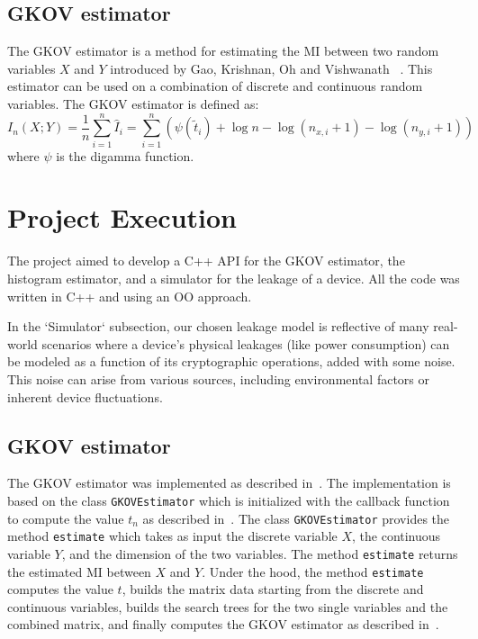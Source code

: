 \documentclass[12pt]{article}
\begin{document}
    \subsection{GKOV estimator}\label{subsec:gkov}
    The GKOV estimator is a method for estimating the MI between two random variables $X$ and $Y$ introduced by Gao, Krishnan, Oh and Vishwanath ~\cite{gao_estimating_2017}.
    This estimator can be used on a combination of discrete and continuous random variables.
    The GKOV estimator is defined as:
    \begin{equation}
        I_n(X;Y) = \frac{1}{n} \sum_{i=1}^n \hat{I}_i = \sum_{i=1}^n \left( \psi(\tilde{t}_i) + \log n - \log(n_{x,i}+1) - \log(n_{y,i}+1) \right)\label{eq:gkov}
    \end{equation}
    where $\psi$ is the digamma function.


    \section{Project Execution}\label{sec:execution}
    The project aimed to develop a C++ API for the GKOV estimator, the histogram estimator, and a simulator for the leakage of a device.
    All the code was written in C++ and using an OO approach.

    In the `Simulator` subsection, our chosen leakage model is reflective of many real-world scenarios where a device's physical leakages (like power consumption) can be modeled as a function of its cryptographic operations, added with some noise.
    This noise can arise from various sources, including environmental factors or inherent device fluctuations.

    \subsection{GKOV estimator}\label{subsec:gkov_impl}
    The GKOV estimator was implemented as described in~\cite{gao_estimating_2017}.
    The implementation is based on the class \texttt{GKOVEstimator} which is initialized with the callback function to compute the value $t_n$ as described in~\cite{chowdhury_leakage_2022}.
    The class \texttt{GKOVEstimator} provides the method \texttt{estimate} which takes as input the discrete variable $X$, the continuous variable $Y$, and the dimension of the two variables.
    The method \texttt{estimate} returns the estimated MI between $X$ and $Y$.
    Under the hood, the method \texttt{estimate} computes the value $t$, builds the matrix data starting from the discrete and continuous variables, builds the search trees for the two single variables and the combined matrix, and finally computes the GKOV estimator as described in~\cite{chowdhury_leakage_2022}.
\end{document}

